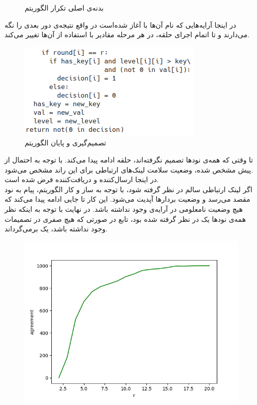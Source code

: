 \documentclass{article}
\begin{document}
\begin{multicols}{2}
\begin{figure}[H]
    \caption{
    بدنه‌ی اصلی تکرار الگوریتم 
    }
    \label{fig:my_label}
\end{figure}
در اینجا آرایه‌هایی که نام آن‌ها با
آغاز شده‌است در واقع نتیجه‌ی دور بعدی را نگه می‌دارند و تا اتمام اجرای حلقه، در هر مرحله مقادیر با استفاده از آن‌ها تغییر می‌کند.
\begin{figure}[H]
    \centering
    \includegraphics[width=0.80\linewidth]{Photos/HW4/finish.png}
    \caption{
    تصمیم‌گیری و پایان الگوریتم
    }
    \label{fig:my_label}
\end{figure}
تا وقتی که همه‌ی نودها تصمیم نگرفته‌اند، حلقه ادامه پیدا می‌کند. با توجه به احتمال از پیش مشخص شده، وضعیت سلامت لینک‌های ارتباطی برای این راند مشخص می‌شود.\\
در اینجا
ارسال‌کننده و
دریافت‌کننده فرض شده است.\\
اگر لینک ارتباطی سالم در نظر گرفته شود، با توجه به ساز و کار الگوریتم، پیام به نود مقصد می‌رسد و وضعیت بردارها آپدیت می‌شود. این کار تا جایی ادامه پیدا می‌کند که هیچ وضعیت نامعلومی در آرایه‌ی
وجود نداشته باشد. در نهایت با توجه به اینکه نظر همه‌ی نودها یک در نظر گرفته شده بود، تابع در صورتی که هیچ صفری در تصمیمات وجود نداشته باشد، یک برمی‌گرداند.
\begin{figure}[H]
    \centering
    \includegraphics[width=0.99\linewidth]{Photos/HW4/one.png}

\end{figure}
\end{multicols}
\end{document}
